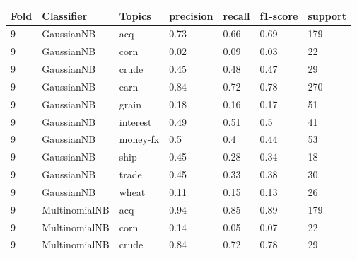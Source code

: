 \documentclass{article}
\begin{document}
\begin{table}[H]
\begin{tabular}{lllllll}
\textbf{Fold} & \textbf{Classifier}    & \textbf{Topics} & \textbf{precision} & \textbf{recall} & \textbf{f1-score} & \textbf{support} \\ \hline
9             & GaussianNB             & acq             & 0.73               & 0.66            & 0.69              & 179              \\
9             & GaussianNB             & corn            & 0.02               & 0.09            & 0.03              & 22               \\
9             & GaussianNB             & crude           & 0.45               & 0.48            & 0.47              & 29               \\
9             & GaussianNB             & earn            & 0.84               & 0.72            & 0.78              & 270              \\
9             & GaussianNB             & grain           & 0.18               & 0.16            & 0.17              & 51               \\
9             & GaussianNB             & interest        & 0.49               & 0.51            & 0.5               & 41               \\
9             & GaussianNB             & money-fx        & 0.5                & 0.4             & 0.44              & 53               \\
9             & GaussianNB             & ship            & 0.45               & 0.28            & 0.34              & 18               \\
9             & GaussianNB             & trade           & 0.45               & 0.33            & 0.38              & 30               \\
9             & GaussianNB             & wheat           & 0.11               & 0.15            & 0.13              & 26               \\
9             & MultinomialNB          & acq             & 0.94               & 0.85            & 0.89              & 179              \\
9             & MultinomialNB          & corn            & 0.14               & 0.05            & 0.07              & 22               \\
9             & MultinomialNB          & crude           & 0.84               & 0.72            & 0.78              & 29               \\

\end{tabular}
\end{table}
\end{document}
